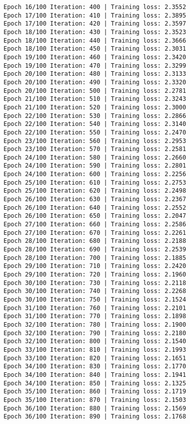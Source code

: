 \documentclass[11pt]{article}
\begin{document}
\begin{Verbatim}[commandchars=\\\{\}]
Epoch 16/100 Iteration: 400 | Training loss: 2.3552
Epoch 17/100 Iteration: 410 | Training loss: 2.3895
Epoch 17/100 Iteration: 420 | Training loss: 2.3597
Epoch 18/100 Iteration: 430 | Training loss: 2.3523
Epoch 18/100 Iteration: 440 | Training loss: 2.3666
Epoch 18/100 Iteration: 450 | Training loss: 2.3031
Epoch 19/100 Iteration: 460 | Training loss: 2.3420
Epoch 19/100 Iteration: 470 | Training loss: 2.3299
Epoch 20/100 Iteration: 480 | Training loss: 2.3133
Epoch 20/100 Iteration: 490 | Training loss: 2.3320
Epoch 20/100 Iteration: 500 | Training loss: 2.2781
Epoch 21/100 Iteration: 510 | Training loss: 2.3243
Epoch 21/100 Iteration: 520 | Training loss: 2.3000
Epoch 22/100 Iteration: 530 | Training loss: 2.2866
Epoch 22/100 Iteration: 540 | Training loss: 2.3140
Epoch 22/100 Iteration: 550 | Training loss: 2.2470
Epoch 23/100 Iteration: 560 | Training loss: 2.2953
Epoch 23/100 Iteration: 570 | Training loss: 2.2581
Epoch 24/100 Iteration: 580 | Training loss: 2.2660
Epoch 24/100 Iteration: 590 | Training loss: 2.2801
Epoch 24/100 Iteration: 600 | Training loss: 2.2256
Epoch 25/100 Iteration: 610 | Training loss: 2.2753
Epoch 25/100 Iteration: 620 | Training loss: 2.2498
Epoch 26/100 Iteration: 630 | Training loss: 2.2367
Epoch 26/100 Iteration: 640 | Training loss: 2.2552
Epoch 26/100 Iteration: 650 | Training loss: 2.2047
Epoch 27/100 Iteration: 660 | Training loss: 2.2586
Epoch 27/100 Iteration: 670 | Training loss: 2.2261
Epoch 28/100 Iteration: 680 | Training loss: 2.2188
Epoch 28/100 Iteration: 690 | Training loss: 2.2539
Epoch 28/100 Iteration: 700 | Training loss: 2.1885
Epoch 29/100 Iteration: 710 | Training loss: 2.2420
Epoch 29/100 Iteration: 720 | Training loss: 2.1960
Epoch 30/100 Iteration: 730 | Training loss: 2.2118
Epoch 30/100 Iteration: 740 | Training loss: 2.2268
Epoch 30/100 Iteration: 750 | Training loss: 2.1524
Epoch 31/100 Iteration: 760 | Training loss: 2.2101
Epoch 31/100 Iteration: 770 | Training loss: 2.1898
Epoch 32/100 Iteration: 780 | Training loss: 2.1900
Epoch 32/100 Iteration: 790 | Training loss: 2.2180
Epoch 32/100 Iteration: 800 | Training loss: 2.1540
Epoch 33/100 Iteration: 810 | Training loss: 2.1993
Epoch 33/100 Iteration: 820 | Training loss: 2.1651
Epoch 34/100 Iteration: 830 | Training loss: 2.1770
Epoch 34/100 Iteration: 840 | Training loss: 2.1941
Epoch 34/100 Iteration: 850 | Training loss: 2.1325
Epoch 35/100 Iteration: 860 | Training loss: 2.1719
Epoch 35/100 Iteration: 870 | Training loss: 2.1503
Epoch 36/100 Iteration: 880 | Training loss: 2.1569
Epoch 36/100 Iteration: 890 | Training loss: 2.1768

\end{Verbatim}
\end{document}
